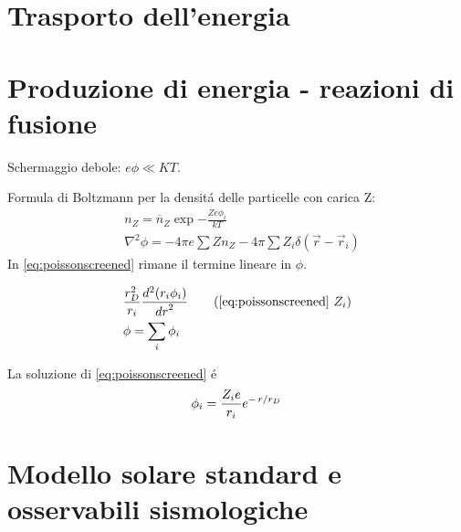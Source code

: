 \section{Trasporto dell'energia}

\section{Produzione di energia - reazioni di fusione}

\begin{block}{Schermaggio debole: $e\phi\ll KT$.}




Formula di Boltzmann per la densit\'a delle particelle con carica Z:
\begin{align}
&n_Z=\overline{n}_Z\exp{-\frac{Ze\phi_i}{kT}}\\
&\nabla^2\phi=-4\pi e\sum Zn_Z-4\pi\sum Z_i\delta(\vec{r}-\vec{r}_i)\label{eq:poissonscreened}
\end{align}
In \eqref{eq:poissonscreened} rimane il termine lineare in $\phi$.





\begin{align}
&\frac{r_D^2}{r_i}\TtwoDy{r}{(r_i\phi_i)}\tag{\ref{eq:poissonscreened} $Z_i$}\\
&\phi=\sum_i\phi_i
\end{align}

La soluzione di \eqref{eq:poissonscreened} \'e
\begin{equation}\label{eq:screenedpotential}
\phi_i=\frac{Z_ie}{r_i}e^{-\left.{r}\middle/{r_D}\right.}
\end{equation}


\end{block}

\section{Modello solare standard e osservabili sismologiche}


